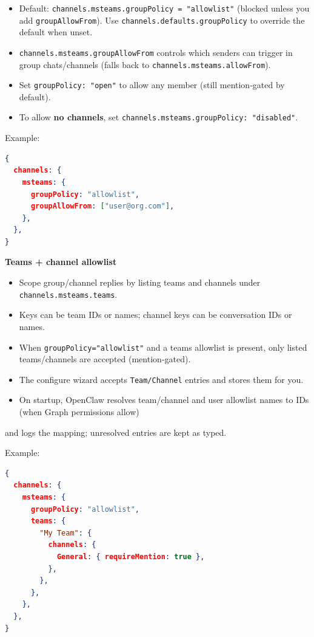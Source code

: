 \begin{itemize}
  \item Default: \texttt{channels.msteams.groupPolicy = "allowlist"} (blocked unless you add \texttt{groupAllowFrom}). Use \texttt{channels.defaults.groupPolicy} to override the default when unset.
  \item \texttt{channels.msteams.groupAllowFrom} controls which senders can trigger in group chats/channels (falls back to \texttt{channels.msteams.allowFrom}).
  \item Set \texttt{groupPolicy: "open"} to allow any member (still mention‑gated by default).
  \item To allow \textbf{no channels}, set \texttt{channels.msteams.groupPolicy: "disabled"}.
\end{itemize}


Example:

\begin{lstlisting}[language=json]
{
  channels: {
    msteams: {
      groupPolicy: "allowlist",
      groupAllowFrom: ["user@org.com"],
    },
  },
}
\end{lstlisting}


\textbf{Teams + channel allowlist}

\begin{itemize}
  \item Scope group/channel replies by listing teams and channels under \texttt{channels.msteams.teams}.
  \item Keys can be team IDs or names; channel keys can be conversation IDs or names.
  \item When \texttt{groupPolicy="allowlist"} and a teams allowlist is present, only listed teams/channels are accepted (mention‑gated).
  \item The configure wizard accepts \texttt{Team/Channel} entries and stores them for you.
  \item On startup, OpenClaw resolves team/channel and user allowlist names to IDs (when Graph permissions allow)
\end{itemize}

and logs the mapping; unresolved entries are kept as typed.

Example:

\begin{lstlisting}[language=json]
{
  channels: {
    msteams: {
      groupPolicy: "allowlist",
      teams: {
        "My Team": {
          channels: {
            General: { requireMention: true },
          },
        },
      },
    },
  },
}
\end{lstlisting}


